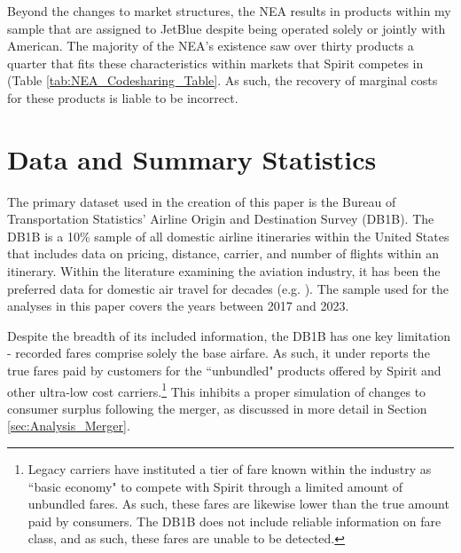 \documentclass{article}
\begin{document}
    Beyond the changes to market structures, the NEA results in products within my sample that are assigned to JetBlue despite being operated solely or jointly with American. The majority of the NEA's existence saw over thirty products a quarter that fits these characteristics within markets that Spirit competes in (Table \ref{tab:NEA_Codesharing_Table}. As such, the recovery of marginal costs for these products is liable to be incorrect.  

	\section{Data and Summary Statistics}
	\label{sec:Data}
	The primary dataset used in the creation of this paper is the Bureau of Transportation Statistics' Airline Origin and Destination Survey (DB1B). The DB1B is a 10\% sample of all domestic airline itineraries within the United States that includes data on pricing, distance, carrier, and number of flights within an itinerary. Within the literature examining the aviation industry, it has been the preferred data for domestic air travel for decades (e.g. \citet{ciliberto_market_2021, berry_tracing_2010, goolsbee_how_2008, peters_evaluating_2006}). The sample used for the analyses in this paper covers the years between 2017 and 2023.  

    Despite the breadth of its included information, the DB1B has one key limitation - recorded fares comprise solely the base airfare. As such, it under reports the true fares paid by customers for the ``unbundled" products offered by Spirit and other ultra-low cost carriers.\footnote{Legacy carriers have instituted a tier of fare known within the industry as ``basic economy" to compete with Spirit through a limited amount of unbundled fares. As such, these fares are likewise lower than the true amount paid by consumers. The DB1B does not include reliable information on fare class, and as such, these fares are unable to be detected.} This inhibits a proper simulation of changes to consumer surplus following the merger, as discussed in more detail in Section \ref{sec:Analysis_Merger}. 
    	
\end{document}
